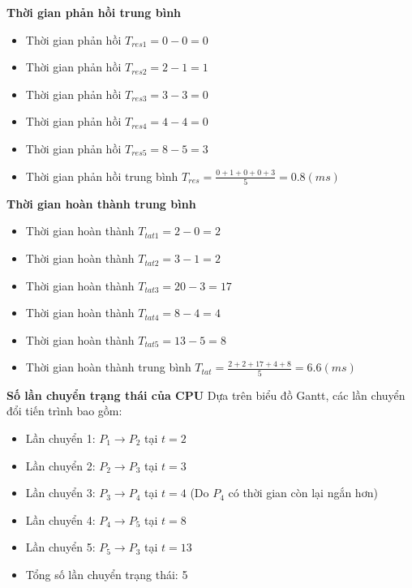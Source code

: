 \documentclass[12pt, letterpaper]{article}
\begin{document}
\textbf{Thời gian phản hồi trung bình}
\begin{itemize}
    \item Thời gian phản hồi $T_{res1} = 0 - 0 = 0$
    \item Thời gian phản hồi $T_{res2} = 2 - 1 = 1$
    \item Thời gian phản hồi $T_{res3} = 3 - 3 = 0$
    \item Thời gian phản hồi $T_{res4} = 4 - 4 = 0$
    \item Thời gian phản hồi $T_{res5} = 8 - 5 = 3$
    \item Thời gian phản hồi trung bình $T_{res} = \frac{0 + 1 + 0 + 0 + 3}{5} = 0.8 (ms)$ 
\end{itemize}

\textbf{Thời gian hoàn thành trung bình}
\begin{itemize}
    \item Thời gian hoàn thành $T_{tat1} = 2 - 0 = 2$
    \item Thời gian hoàn thành $T_{tat2} = 3 - 1 = 2$
    \item Thời gian hoàn thành $T_{tat3} = 20 - 3 = 17$
    \item Thời gian hoàn thành $T_{tat4} = 8 - 4 = 4$
    \item Thời gian hoàn thành $T_{tat5} = 13 - 5 = 8$
    \item Thời gian hoàn thành trung bình $T_{tat} = \frac{2 + 2 + 17 + 4 + 8}{5} = 6.6 (ms)$ 
\end{itemize}

\textbf{Số lần chuyển trạng thái của CPU}
Dựa trên biểu đồ Gantt, các lần chuyển đổi tiến trình bao gồm:
\begin{itemize}
    \item Lần chuyển 1: $P_1 \rightarrow P_2$ tại $t=2$
    \item Lần chuyển 2: $P_2 \rightarrow P_3$ tại $t=3$
    \item Lần chuyển 3: $P_3 \rightarrow P_4$ tại $t=4$ (Do $P_4$ có thời gian còn lại ngắn hơn)
    \item Lần chuyển 4: $P_4 \rightarrow P_5$ tại $t=8$
    \item Lần chuyển 5: $P_5 \rightarrow P_3$ tại $t=13$
    \item Tổng số lần chuyển trạng thái: 5
\end{itemize}
\end{document}

